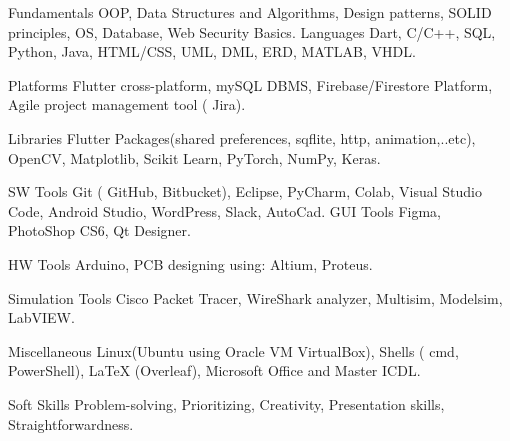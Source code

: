 

\begin{cvskills}

  \cvskill
    {Fundamentals} %
    {OOP, Data Structures and Algorithms, Design patterns, SOLID principles, OS, Database, Web Security Basics.} %
\cvskill
{Languages} %
{ Dart, C/C++, SQL, Python, Java, HTML/CSS, UML, DML, ERD, MATLAB, VHDL.} %

\cvskill
{Platforms} %
{ Flutter cross-platform, mySQL DBMS, Firebase/Firestore Platform, Agile project management tool ( Jira). } %

\cvskill
{Libraries} %
{Flutter Packages(shared preferences, sqflite, http, animation,..etc), OpenCV, Matplotlib, Scikit Learn, PyTorch, NumPy, Keras.} %

\cvskill
{SW Tools} %
{Git ( GitHub, Bitbucket), Eclipse, PyCharm, Colab, Visual Studio Code, Android Studio, WordPress, Slack, AutoCad.} %
\cvskill
{GUI Tools} %
{Figma, PhotoShop CS6, Qt Designer.} %

\cvskill
{HW Tools} %
{Arduino, PCB designing using: Altium, Proteus.} %

\cvskill
{Simulation Tools} %
{Cisco Packet Tracer, WireShark analyzer, Multisim, Modelsim, LabVIEW.} %

  \cvskill
    {Miscellaneous} %
    {Linux(Ubuntu using Oracle VM VirtualBox), Shells ( cmd, PowerShell), LaTeX (Overleaf), Microsoft Office and Master ICDL.} %

  \cvskill
    {Soft Skills} %
    {Problem-solving, Prioritizing, Creativity, Presentation skills, Straightforwardness.} %

\end{cvskills}
